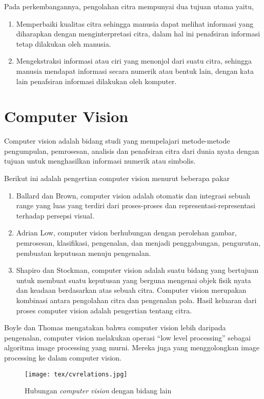 \documentclass[laporan.tex]{subfiles}
\begin{document}
Pada perkembangannya,  pengolahan citra mempunyai dua tujuan utama yaitu,
\begin{enumerate}
\item Memperbaiki kualitas citra sehingga manusia dapat melihat informasi yang diharapkan dengan menginterpretasi citra, dalam hal ini penafsiran informasi tetap dilakukan oleh manusia.
\item Mengekstraksi informasi atau ciri yang menonjol dari suatu citra, sehingga manusia mendapat informasi secara numerik atau bentuk lain, dengan kata lain penafsiran informasi dilakukan oleh komputer.
\end{enumerate}

\section{Computer Vision}

Computer vision adalah bidang studi yang mempelajari metode-metode pengumpulan, pemrosesan, analisis dan penafsiran citra dari dunia nyata dengan tujuan untuk menghasilkan informasi numerik atau simbolis.

Berikut ini adalah pengertian computer vision menurut beberapa pakar

\begin{enumerate}
\item Ballard dan Brown, computer vision adalah otomatis dan integrasi sebuah range yang luas yang terdiri dari proses-proses dan representasi-representasi terhadap persepsi visual.
\item Adrian Low, computer vision berhubungan dengan perolehan gambar, pemrosesan, klasifikasi, pengenalan, dan menjadi penggabungan, pengurutan, pembuatan keputusan menuju pengenalan.
\item Shapiro dan Stockman, computer vision adalah suatu bidang yang bertujuan untuk membuat suatu keputusan yang berguna mengenai objek fisik nyata dan keadaan berdasarkan atas sebuah citra. Computer vision merupakan kombinasi antara pengolahan citra dan pengenalan pola. Hasil keluaran dari proses computer vision adalah pengertian tentang citra.
\end{enumerate}

Boyle dan Thomas mengatakan bahwa computer vision lebih daripada pengenalan, computer vision melakukan operasi “low level processing” sebagai algoritma image processing yang murni. Mereka juga yang menggolongkan image processing ke dalam computer vision.

\begin{figure}[h]
\centering
\texttt{[image: tex/cvrelations.jpg]}
\caption{Hubungan \emph{computer vision} dengan bidang lain}
\end{figure}
\end{document}
